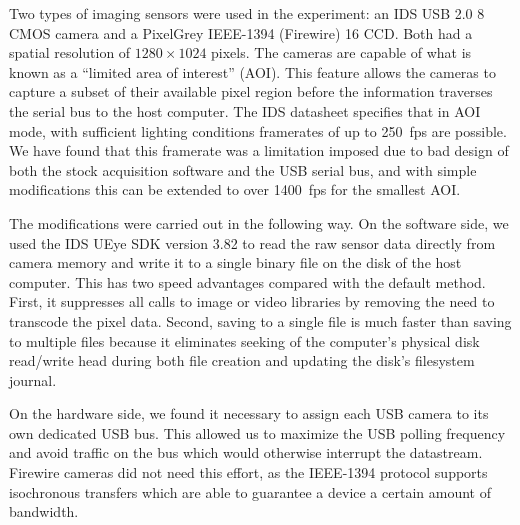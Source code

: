 Two types of imaging sensors were used in the experiment: an IDS USB 2.0
\SI{8}{\bit} CMOS camera and a PixelGrey IEEE-1394 (Firewire) \SI{16}{\bit}
CCD.  Both had a spatial resolution of $1280\times1024$ pixels.  The
cameras are capable of what is known as a ``limited area of interest''
(AOI).  This feature allows the cameras to capture a subset of their
available pixel region before the information traverses the serial bus to
the host computer.  The IDS datasheet specifies that in AOI mode, with
sufficient lighting conditions framerates of up to \SI{250}{fps} are
possible.  We have found that this framerate was a limitation imposed due
to bad design of both the stock acquisition software and the USB serial
bus, and with simple modifications this can be extended to over
\SI{1400}{fps} for the smallest AOI.

The modifications were carried out in the following way.  On the software
side, we used the IDS UEye SDK version 3.82 to read the raw sensor data
directly from camera memory and write it to a single binary file on the
disk of the host computer.  This has two speed advantages compared with the
default method.  First, it suppresses all calls to image or video libraries
by removing the need to transcode the pixel data.  Second, saving to a
single file is much faster than saving to multiple files because it
eliminates seeking of the computer's physical disk read/write head during
both file creation and updating the disk's filesystem journal.  

On the hardware side, we found it necessary to assign each USB camera to
its own dedicated USB bus.  This allowed us to maximize the USB polling
frequency and avoid traffic on the bus which would otherwise interrupt the
datastream.  Firewire cameras did not need this effort, as the IEEE-1394
protocol supports isochronous transfers which are able to guarantee a
device a certain amount of bandwidth.

